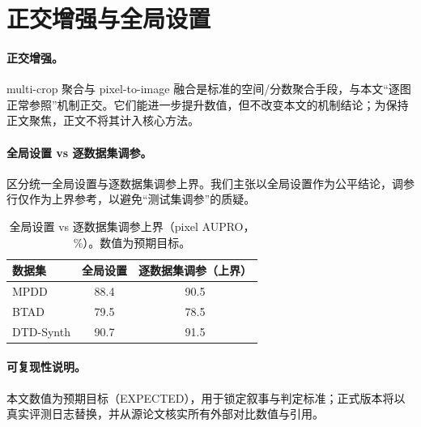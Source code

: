 \section{正交增强与全局设置}
\label{sec:appendix}

\paragraph{正交增强。}
multi-crop 聚合与 pixel-to-image 融合是标准的空间/分数聚合手段，与本文“逐图正常参照”机制正交。它们能进一步提升数值，但不改变本文的机制结论；为保持正文聚焦，正文不将其计入核心方法。

\paragraph{全局设置 vs 逐数据集调参。}
 区分统一全局设置与逐数据集调参上界。我们主张以全局设置作为公平结论，调参行仅作为上界参考，以避免“测试集调参”的质疑。

\begin{table}[h]
\centering
\caption{全局设置 vs 逐数据集调参上界（pixel AUPRO，\%）。数值为预期目标。}
\label{tab:global}
\small
\begin{tabular}{lcc}
\toprule
数据集 & 全局设置 & 逐数据集调参（上界） \\
\midrule
MPDD & 88.4 & 90.5 \\
BTAD & 79.5 & 78.5 \\
DTD-Synth & 90.7 & 91.5 \\
\bottomrule
\end{tabular}
\end{table}

\paragraph{可复现性说明。}
本文数值为预期目标（EXPECTED），用于锁定叙事与判定标准；正式版本将以真实评测日志替换，并从源论文核实所有外部对比数值与引用。
